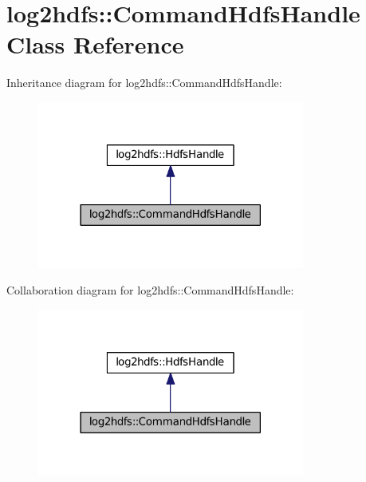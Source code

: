\hypertarget{classlog2hdfs_1_1CommandHdfsHandle}{}\section{log2hdfs\+:\+:Command\+Hdfs\+Handle Class Reference}
\label{classlog2hdfs_1_1CommandHdfsHandle}


Inheritance diagram for log2hdfs\+:\+:Command\+Hdfs\+Handle\+:
\nopagebreak
\begin{figure}[H]
\begin{center}
\leavevmode
\includegraphics[width=249pt]{classlog2hdfs_1_1CommandHdfsHandle__inherit__graph}
\end{center}
\end{figure}


Collaboration diagram for log2hdfs\+:\+:Command\+Hdfs\+Handle\+:
\nopagebreak
\begin{figure}[H]
\begin{center}
\leavevmode
\includegraphics[width=249pt]{classlog2hdfs_1_1CommandHdfsHandle__coll__graph}
\end{center}
\end{figure}
